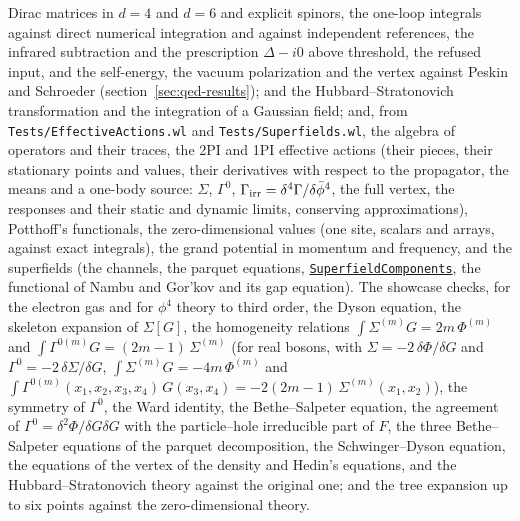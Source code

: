 \documentclass[11pt,a4paper]{article}
\newcommand{\pkg}[1]{\texttt{#1}}
\newcommand{\fnref}[1]{\hyperref[fn:#1]{\pkg{#1}}}
\begin{document}
Dirac matrices in $d=4$ and $d=6$ and explicit spinors, the one-loop integrals against direct numerical integration and
against independent references, the infrared subtraction and the prescription $\Delta-i0$ above threshold, the refused
input, and the self-energy, the vacuum polarization and the vertex against Peskin and Schroeder (section~\ref{sec:qed-results});
and the Hubbard--Stratonovich transformation and the integration of a Gaussian field; and, from
\pkg{Tests/EffectiveActions.wl} and \pkg{Tests/Superfields.wl}, the algebra of operators and their traces, the 2PI and 1PI
effective actions (their pieces, their stationary points and values, their derivatives with respect to the propagator, the
means and a one-body source: $\Sigma$, $\Gamma^0$, $\Gamma_{\rm irr}=\delta^4\Gamma/\delta\bar\phi^4$, the full vertex, the
responses and their static and dynamic limits, conserving approximations), Potthoff's functionals, the zero-dimensional
values (one site, scalars and arrays, against exact integrals), the grand potential in momentum and frequency, and the
superfields (the channels, the parquet equations, \fnref{SuperfieldComponents}, the functional of Nambu and Gor'kov and its
gap equation). The
showcase checks, for the electron gas and for $\phi^4$ theory to third order, the Dyson equation, the skeleton expansion of
$\Sigma[G]$, the homogeneity relations $\int\Sigma^{(m)}G=2m\,\Phi^{(m)}$ and $\int\Gamma^{0(m)}G=(2m-1)\,\Sigma^{(m)}$ (for real
bosons, with $\Sigma=-2\,\delta\Phi/\delta G$ and $\Gamma^0=-2\,\delta\Sigma/\delta G$, $\int\Sigma^{(m)}G=-4m\,\Phi^{(m)}$ and
$\int\Gamma^{0(m)}(x_1,x_2,x_3,x_4)\,G(x_3,x_4)=-2(2m-1)\,\Sigma^{(m)}(x_1,x_2)$), the
symmetry of $\Gamma^0$, the Ward identity, the Bethe--Salpeter equation, the agreement of $\Gamma^0=\delta^2\Phi/\delta G\delta
G$ with the particle--hole irreducible part of $F$, the three Bethe--Salpeter equations of the parquet decomposition,
the Schwinger--Dyson equation, the equations of the vertex of the density and Hedin's equations, and the
Hubbard--Stratonovich theory against the original one; and the tree expansion up to six points against the
zero-dimensional theory.
\end{document}
